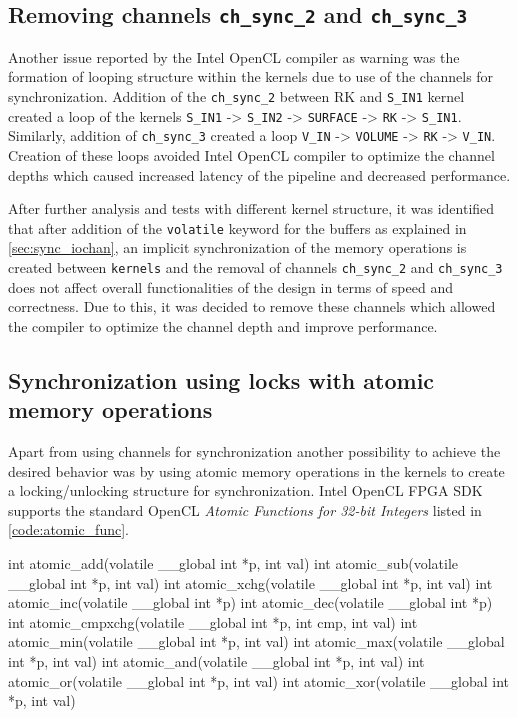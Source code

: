 \subsection*{Removing channels \texttt{ch\_sync\_2} and \texttt{ch\_sync\_3}}

Another issue reported by the Intel OpenCL compiler as warning was the formation of looping
structure within the kernels due to use of the channels for synchronization.
Addition of the \texttt{ch\_sync\_2} between RK and \texttt{S\_IN1} kernel created
a loop of the kernels \texttt{S\_IN1} -> \texttt{S\_IN2} -> \texttt{SURFACE} -> \texttt{RK} -> \texttt{S\_IN1}.
Similarly, addition of \texttt{ch\_sync\_3} created a loop \texttt{V\_IN} -> \texttt{VOLUME} -> \texttt{RK} -> \texttt{V\_IN}.
Creation of these loops avoided Intel OpenCL compiler to optimize the channel depths
which caused increased latency of the pipeline and decreased performance.

After further analysis and tests with different kernel structure, it was identified that
after addition of the \texttt{volatile} keyword for the buffers as explained in \ref{sec:sync_iochan},
an implicit synchronization of the memory operations is created between \texttt{kernels} and the removal of channels \texttt{ch\_sync\_2} and
\texttt{ch\_sync\_3} does not affect overall functionalities of the design in terms of speed
and correctness. Due to this, it was decided to remove these channels which allowed the
compiler to optimize the channel depth and improve performance.

\subsection{Synchronization using locks with atomic memory operations}

Apart from using channels for synchronization another possibility to achieve
the desired behavior was by using atomic memory operations in the kernels
to create a locking/unlocking structure for synchronization. Intel
OpenCL FPGA SDK supports the standard OpenCL \textit{Atomic Functions for 32-bit Integers}
listed in \ref{code:atomic_func}.

\begin{CppCode}[caption=Interger versions of the atomic operations supported by Intel
    OpenCL FPGA SDK, frame=tlrb, label=code:atomic_func, float]
int atomic_add(volatile __global int *p, int val)
int atomic_sub(volatile __global int *p, int val)
int atomic_xchg(volatile __global int *p, int val)
int atomic_inc(volatile __global int *p)
int atomic_dec(volatile __global int *p)
int atomic_cmpxchg(volatile __global int *p, int cmp, int val)
int atomic_min(volatile __global int *p, int val)
int atomic_max(volatile __global int *p, int val)
int atomic_and(volatile __global int *p, int val)
int atomic_or(volatile __global int *p, int val)
int atomic_xor(volatile __global int *p, int val)
\end{CppCode}

